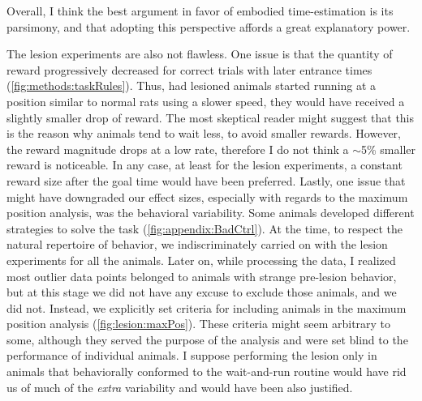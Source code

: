Overall, I think the best argument in favor of embodied time-estimation is its parsimony, and that adopting this perspective affords a great explanatory power.
\par
The lesion experiments are also not flawless.
One issue is that the quantity of reward progressively decreased for correct trials with later entrance times (\autoref{fig:methods:taskRules}).
Thus, had lesioned animals started running at a position similar to normal rats using a slower speed, they would have received a slightly smaller drop of reward.
The most skeptical reader might suggest that this is the reason why animals tend to wait less, to avoid smaller rewards.
However, the reward magnitude drops at a low rate, therefore I do not think a $\sim$5\% smaller reward is noticeable.
In any case, at least for the lesion experiments, a constant reward size after the goal time would have been preferred.
Lastly, one issue that might have downgraded our effect sizes, especially with regards to the maximum position analysis, was the behavioral variability.
Some animals developed different strategies to solve the task (\autoref{fig:appendix:BadCtrl}).
At the time, to respect the natural repertoire of behavior, we indiscriminately carried on with the lesion experiments for all the animals.
Later on, while processing the data, I realized most outlier data points belonged to animals with strange pre-lesion behavior, but at this stage we did not have any excuse to exclude those animals, and we did not.
Instead, we explicitly set criteria for including animals in the maximum position analysis (\autoref{fig:lesion:maxPos}).
These criteria might seem arbitrary to some, although they served the purpose of the analysis and were set blind to the performance of individual animals.
I suppose performing the lesion only in animals that behaviorally conformed to the wait-and-run routine would have rid us of much of the \textit{extra} variability and would have been also justified.


